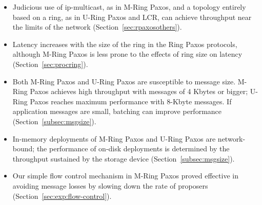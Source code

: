 \documentclass[final,3p,times,twocolumn,authoryear]{elsarticle}
\begin{document}
\begin{itemize}

\item Judicious use of ip-multicast, as in M-Ring Paxos, and a topology entirely based on a ring, as in U-Ring Paxos and LCR, can achieve throughput near the limits of the network (Section~\ref{sec:rpaxosothers}).

\item Latency increases with the size of the ring in the Ring Paxos protocols, although M-Ring Paxos is less prone to the effects of ring size on latency (Section~\ref{sec:procring}).

\item Both M-Ring Paxos and U-Ring Paxos are susceptible to message size. M-Ring Paxos achieves high throughput with messages of 4 Kbytes or bigger; U-Ring Paxos reaches maximum performance with 8-Kbyte messages.
If application messages are small, batching can improve performance (Section~\ref{subsec:msgsize}).

\item In-memory deployments of M-Ring Paxos and U-Ring Paxos are network-bound; the performance of on-disk deployments is determined by the throughput sustained by the storage device (Section~\ref{subsec:msgsize}).





\item Our simple flow control mechanism in M-Ring Paxos proved effective in avoiding message losses by slowing down the rate of proposers (Section~\ref{sec:exp:flow-control}).



\end{itemize}
\end{document}
